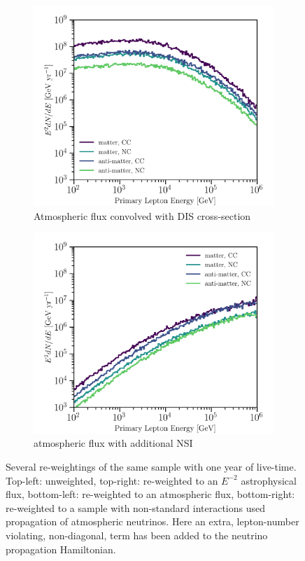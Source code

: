 \documentclass[main.tex]{subfiles}
\begin{document}
\begin{figure}[h]
\begin{subfigure}[b]{0.45\linewidth}
    \end{subfigure}\\
    \begin{subfigure}[b]{0.45\linewidth}
    	\centering
        \includegraphics[width=1.0\linewidth]{figures/totalE_weighted_atmo.png}
        \caption{Atmospheric flux convolved with DIS cross-section}
    \end{subfigure}%
    \begin{subfigure}[b]{0.45\linewidth}
    	\centering
        \includegraphics[width=1.0\linewidth]{figures/totalE_weighted_bsm.png}
        \caption{atmospheric flux with additional NSI}
    \end{subfigure}
    \caption{Several re-weightings of the same sample with one year of live-time. Top-left: unweighted, top-right: re-weighted to an $E^{-2}$ astrophysical flux, bottom-left: re-weighted to an atmospheric flux, bottom-right: re-weighted to a sample with non-standard interactions used propagation of atmospheric neutrinos. Here an extra, lepton-number violating, non-diagonal, term has been added to the neutrino propagation Hamiltonian.}\label{fig:weightings}
\end{figure}
\end{document}
